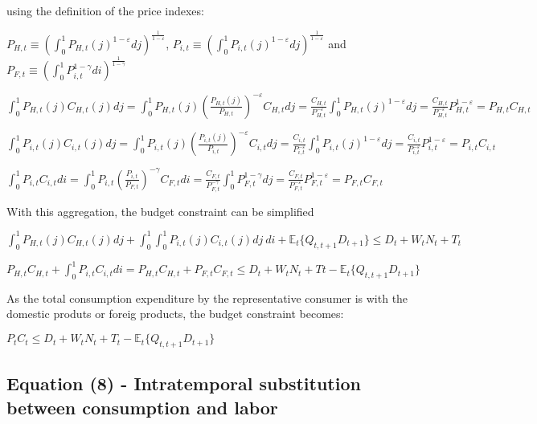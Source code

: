 \documentclass[
]{article}
\begin{document}
using the definition of the price indexes:

\(\displaystyle P_{H,t} \equiv \left( \int_0^1 P_{H,t}(j)^{1-\varepsilon}dj \right)^{\frac{1}{1-\varepsilon}}\),
\(\displaystyle P_{i,t} \equiv \left( \int_0^1 P_{i,t}(j)^{1-\varepsilon}dj \right)^{\frac{1}{1-\varepsilon}}\)
and
\(\displaystyle P_{F,t} \equiv \left( \int_0^1 P_{i,t}^{1-\gamma}di \right)^{\frac{1}{1-\gamma}}\)

\(\displaystyle \int_0^1 P_{H,t}(j)C_{H,t}(j)dj = \int_0^1P_{H,t}(j)\left( \frac{P_{H,t}(j)}{P_{H,t}}\right)^{-\varepsilon}C_{H,t}dj = \frac{C_{H,t}}{P_{H,t}^{-\varepsilon}}\int_0^1P_{H,t}(j)^{1-\varepsilon}dj = \frac{C_{H,t}}{P_{H,t}^{-\varepsilon}}P_{H,t}^{1-\varepsilon} = P_{H,t}C_{H,t}\)

\(\displaystyle \int_0^1 P_{i,t}(j)C_{i,t}(j)dj = \int_0^1P_{i,t}(j)\left( \frac{P_{i,t}(j)}{P_{i,t}}\right)^{-\varepsilon}C_{i,t}dj = \frac{C_{i,t}}{P_{i,t}^{-\varepsilon}}\int_0^1 P_{i,t}(j)^{1-\varepsilon}dj = \frac{C_{i,t}}{P_{i,t}^{-\varepsilon}}P_{i,t}^{1-\varepsilon} = P_{i,t}C_{i,t}\)

\(\displaystyle \int_0^1 P_{i,t}C_{i,t}di = \int_0^1P_{i,t}\left( \frac{P_{i,t}}{P_{F,t}}\right)^{-\gamma}C_{F,t}di = \frac{C_{F,t}}{P_{F,t}^{-\gamma}}\int_0^1 P_{F,t}^{1-\gamma}dj = \frac{C_{F,t}}{P_{F,t}^{-\varepsilon}}P_{F,t}^{1-\varepsilon} = P_{F,t}C_{F,t}\)

With this aggregation, the budget constraint can be simplified

\(\displaystyle \int_0^1 P_{H,t}(j)C_{H,t}(j)dj + \int_0^1\int_0^1 P_{i,t}(j)C_{i,t}(j)dj\ di + \mathbb{E}_t\{ Q_{t,t+1}D_{t+1}\} \leq D_t + W_tN_t + T_t\)

\(\displaystyle P_{H,t}C_{H,t} + \int_0^1P_{i,t}C_{i,t}di = P_{H,t}C_{H,t} + P_{F,t}C_{F,t} \leq D_t + W_tN_t + Tt - \mathbb{E}_t\{ Q_{t,t+1}D_{t+1}\}\)

As the total consumption expenditure by the representative consumer is
with the domestic produts or foreig products, the budget constraint
becomes:

\(\displaystyle P_t C_t \leq D_t + W_tN_t + T_t - \mathbb{E}_t\{ Q_{t,t+1}D_{t+1}\}\)

\vspace{12pt}

\hypertarget{equation-8---intratemporal-substitution-between-consumption-and-labor}{%
\subsection{Equation (8) - Intratemporal substitution between
consumption and
labor}\label{equation-8---intratemporal-substitution-between-consumption-and-labor}}
\end{document}
